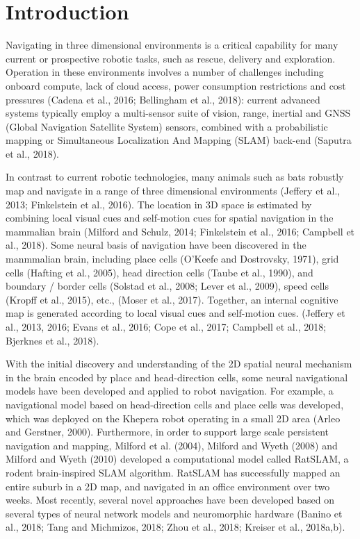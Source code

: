 \section{Introduction}
\label{sec:intro}
\hspace{1pc}Navigating in three dimensional environments is a critical capability for many current or prospective robotic tasks, such as rescue, delivery and exploration. 
Operation in these environments involves a number of challenges including onboard compute, lack of cloud access, power consumption restrictions and cost pressures (Cadena et al., 2016; Bellingham et al., 2018): 
current advanced systems typically employ a multi-sensor suite of vision, range, inertial and GNSS (Global Navigation Satellite System) sensors, combined with a probabilistic mapping or Simultaneous Localization And Mapping (SLAM) back-end (Saputra et al., 2018).


In contrast to current robotic technologies, many animals such as bats robustly map and navigate in a range of three dimensional environments (Jeffery et al., 2013; Finkelstein et al., 2016). 
The location in 3D space is estimated by combining local visual cues and self-motion cues for spatial navigation in the mammalian brain (Milford and Schulz, 2014; Finkelstein et al., 2016; Campbell et al., 2018). 
Some neural basis of navigation have been discovered in the manmmalian brain, including place cells (O'Keefe and Dostrovsky, 1971), grid cells (Hafting et al., 2005), head direction cells (Taube et al., 1990), and boundary / border cells (Solstad et al., 2008; Lever et al., 2009), speed cells (Kropff et al., 2015), etc., (Moser et al., 2017). 
Together, an internal cognitive map is generated according to local visual cues and self-motion cues. (Jeffery et al., 2013, 2016; Evans et al., 2016; Cope et al., 2017; Campbell et al., 2018; Bjerknes et al., 2018).


With the initial discovery and understanding of the 2D spatial neural mechanism in the brain encoded by place and head-direction cells, some neural navigational models have been developed and applied to robot navigation. 
For example, a navigational model based on head-direction cells and place cells was developed, which was deployed on the Khepera robot operating in a small 2D area (Arleo and Gerstner, 2000). 
Furthermore, in order to support large scale persistent navigation and mapping, Milford et al. (2004), Milford and Wyeth (2008) and Milford and Wyeth (2010) developed a computational model called RatSLAM, a rodent brain-inspired SLAM algorithm. 
RatSLAM has successfully mapped an entire suburb in a 2D map, and navigated in an office environment over two weeks. 
Most recently, several novel approaches have been developed based on several types of neural network models and neuromorphic hardware (Banino et al., 2018; Tang and Michmizos, 2018; Zhou et al., 2018; Kreiser et al., 2018a,b).


